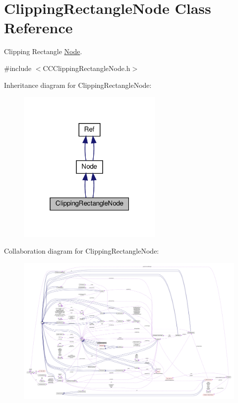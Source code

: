 \hypertarget{classClippingRectangleNode}{}\section{Clipping\+Rectangle\+Node Class Reference}
\label{classClippingRectangleNode}


Clipping Rectangle \hyperlink{classNode}{Node}.  




{\ttfamily \#include $<$C\+C\+Clipping\+Rectangle\+Node.\+h$>$}



Inheritance diagram for Clipping\+Rectangle\+Node\+:
\nopagebreak
\begin{figure}[H]
\begin{center}
\leavevmode
\includegraphics[width=199pt]{classClippingRectangleNode__inherit__graph}
\end{center}
\end{figure}


Collaboration diagram for Clipping\+Rectangle\+Node\+:
\nopagebreak
\begin{figure}[H]
\begin{center}
\leavevmode
\includegraphics[width=350pt]{classClippingRectangleNode__coll__graph}
\end{center}
\end{figure}
